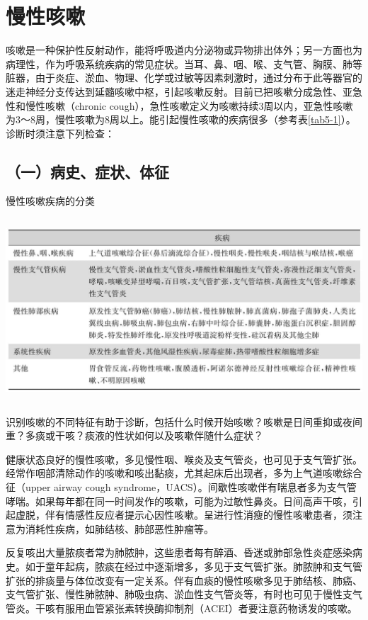 \chapter{慢性咳嗽}

咳嗽是一种保护性反射动作，能将呼吸道内分泌物或异物排出体外；另一方面也为病理性，作为呼吸系统疾病的常见症状。当耳、鼻、咽、喉、支气管、胸膜、肺等脏器，由于炎症、淤血、物理、化学或过敏等因素刺激时，通过分布于此等器官的迷走神经分支传达到延髓咳嗽中枢，引起咳嗽反射。目前已把咳嗽分成急性、亚急性和慢性咳嗽（chronic
cough），急性咳嗽定义为咳嗽持续3周以内，亚急性咳嗽为3～8周，慢性咳嗽为8周以上。能引起慢性咳嗽的疾病很多（参考表\ref{tab5-1}）。诊断时须注意下列检查：

\section{（一）病史、症状、体征}

\begin{table}[htbp]
\centering
\caption{慢性咳嗽疾病的分类}
\label{tab5-1}
\includegraphics[width=5.90625in,height=2.69792in]{./images/Image00044.jpg}
\end{table}

识别咳嗽的不同特征有助于诊断，包括什么时候开始咳嗽？咳嗽是日间重抑或夜间重？多痰或干咳？痰液的性状如何以及咳嗽伴随什么症状？

健康状态良好的慢性咳嗽，多见慢性咽、喉炎及支气管炎，也可见于支气管扩张。经常作咽部清除动作的咳嗽和咳出黏痰，尤其起床后出现者，多为上气道咳嗽综合征（upper
airway cough
syndrome，UACS）。间歇性咳嗽伴有喘息者多为支气管哮喘。如果每年都在同一时间发作的咳嗽，可能为过敏性鼻炎。日间高声干咳，引起虚脱，伴有情感性反应者提示心因性咳嗽。呈进行性消瘦的慢性咳嗽患者，须注意为消耗性疾病，如肺结核、肺部恶性肿瘤等。

反复咳出大量脓痰者常为肺脓肿，这些患者每有醉酒、昏迷或肺部急性炎症感染病史。如于童年起病，脓痰在经过中逐渐增多，多见于支气管扩张。肺脓肿和支气管扩张的排痰量与体位改变有一定关系。伴有血痰的慢性咳嗽多见于肺结核、肺癌、支气管扩张、慢性肺脓肿、肺吸虫病、淤血性支气管炎等，有时也可见于慢性支气管炎。干咳有服用血管紧张素转换酶抑制剂（ACEI）者要注意药物诱发的咳嗽。

